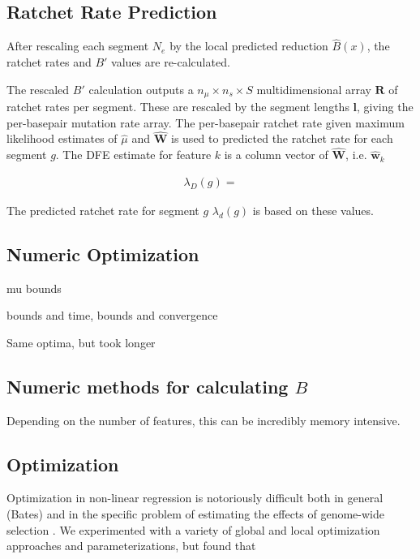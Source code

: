 \documentclass[11pt]{article}
\begin{document}
\subsection{Ratchet Rate Prediction}

After rescaling each segment $N_e$ by the local predicted reduction
$\hat{B}(x)$, the ratchet rates and $B'$ values are re-calculated. 

The rescaled $B'$ calculation outputs a $n_\mu \times n_s \times S$
multidimensional array $\mathbf{R}$ of ratchet rates per segment. These are
rescaled by the segment lengths $\mathbf{l}$, giving the per-basepair mutation
rate array. The per-basepair ratchet rate given maximum likelihood estimates of
$\hat{\mu}$ and $\widehat{\mathbf{W}}$ is used to predicted the ratchet rate
for each segment $g$. The DFE estimate for feature $k$ is a column vector of
$\widehat{\mathbf{W}}$, i.e. $\widehat{\mathbf{w}}_k$

\begin{align}
  \lambda_D(g) = 
\end{align}

The predicted ratchet rate for segment $g$ $\lambda_d(g)$ is based on these
values.
 
\subsection{Numeric Optimization}
\label{supp:optim}


mu bounds 

bounds and time, bounds and convergence

Same optima, but took longer



\subsection{Numeric methods for calculating $B$}

Depending on the number of features, this can be incredibly memory intensive.

\subsection{Optimization}

Optimization in non-linear regression is notoriously difficult both in general
(Bates) and in the specific problem of estimating the effects of genome-wide
selection \parencite{Murphy2022-sj}. We experimented with a variety of global
and local optimization approaches and parameterizations, but found that 
\end{document}
